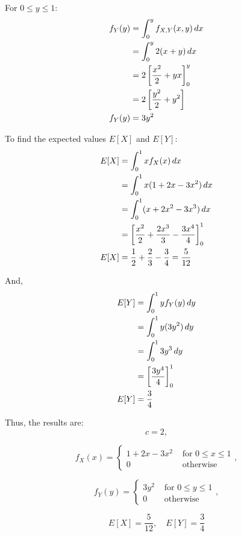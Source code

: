 \documentclass[a4paper, 10pt]{article}
\begin{document}
\begin{tosubmit}
For \( 0 \leq y \leq 1 \):
\begin{align*}
    f_Y(y) &= \int_0^y f_{X,Y}(x, y) \, dx \\
    &= \int_0^y 2(x + y) \, dx \\
    &= 2 \left[\frac{x^2}{2} + yx\right]_{0}^{y} \\
    &= 2 \left[\frac{y^2}{2} + y^2\right] \\
    f_Y(y) &= 3y^2
\end{align*}

\pagebreak

To find the expected values \( E[X] \) and \( E[Y] \):
\begin{align*}
    E[X] &= \int_0^1 x f_X(x) \, dx \\
    &= \int_0^1 x (1 + 2x - 3x^2) \, dx \\
    &= \int_0^1 (x + 2x^2 - 3x^3) \, dx \\
    &= \left[\frac{x^2}{2} + \frac{2x^3}{3} - \frac{3x^4}{4}\right]_{0}^{1} \\
    E[X] &= \frac{1}{2} + \frac{2}{3} - \frac{3}{4} = \frac{5}{12}
\end{align*}

And,
\begin{align*}
    E[Y] &= \int_0^1 y f_Y(y) \, dy \\
    &= \int_0^1 y (3y^2) \, dy \\
    &= \int_0^1 3y^3 \, dy \\
    &= \left[\frac{3y^4}{4}\right]_{0}^{1} \\
    E[Y] &= \frac{3}{4}
\end{align*}

Thus, the results are:
\[ \boxed{c = 2}, \]

\[ \boxed{f_X(x) = \begin{cases}
    1 + 2x - 3x^2 & \text{ for } 0 \leq x \leq 1 \\
    0 & \text{ otherwise }
\end{cases}}, \]

\[ \boxed{f_Y(y) = \begin{cases}
    3y^2 & \text{ for } 0 \leq y \leq 1 \\
    0 & \text{ otherwise }
\end{cases}}, \]

\[ \boxed{E[X] = \frac{5}{12}}, \quad \boxed{E[Y] = \frac{3}{4}} \]
\end{tosubmit}
\end{document}
